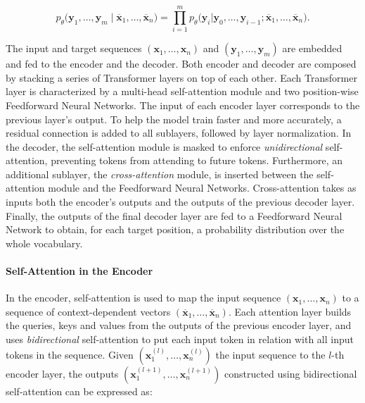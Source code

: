 \begin{equation}
    p_{\theta} \bigl( \bm{y}_1, \ldots, \bm{y}_m \mid \overline{\bm{x}}_1, \ldots, \overline{\bm{x}}_n \bigr) = \prod_{i=1}^{m} p_{\theta}\bigl(\bm{y}_i |\bm{y}_0, \ldots, \bm{y}_{i-1}; \overline{\bm{x}}_1, \ldots, \overline{\bm{x}}_n\bigr).
\end{equation}

The input and target sequences $(\bm{x}_1, \ldots, \bm{x}_n)$ and $(\bm{y}_1, \ldots, \bm{y}_m)$ are embedded and fed to the encoder and the decoder. Both encoder and decoder are composed by stacking a series of Transformer layers on top of each other. Each Transformer layer is characterized by a multi-head self-attention module and two position-wise Feedforward Neural Networks. The input of each encoder layer corresponds to the previous layer's output. To help the model train faster and more accurately, a residual connection \citep{he2016deep} is added to all sublayers, followed by layer normalization. In the decoder, the self-attention module is masked to enforce \textit{unidirectional} self-attention, preventing tokens from attending to future tokens. Furthermore, an additional sublayer, the \textit{cross-attention} module, is inserted between the self-attention module and the Feedforward Neural Networks. Cross-attention takes as inputs both the encoder's outputs and the outputs of the previous decoder layer. Finally, the outputs of the final decoder layer are fed to a Feedforward Neural Network to obtain, for each target position, a probability distribution over the whole vocabulary.




\paragraph{Self-Attention in the Encoder} In the encoder, self-attention is used to map the input sequence $(\bm{x}_1, \ldots, \bm{x}_n)$ to a sequence of context-dependent vectors $(\overline{\bm{x}}_1, \ldots, \overline{\bm{x}}_n)$. Each attention layer builds the queries, keys and values from the outputs of the previous encoder layer, and uses \textit{bidirectional} self-attention to put each input token in relation with all input tokens in the sequence. Given $(\bm{x}^{(l)}_1, \ldots, \bm{x}^{(l)}_n)$ the input sequence to the $l$-th encoder layer, the outputs $(\bm{x}^{(l+1)}_1, \ldots, \bm{x}^{(l+1)}_n)$ constructed using bidirectional self-attention can be expressed as:

